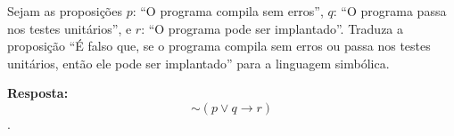 \documentclass{ufcdocument}
\begin{document}
\def\course{Lógica para Ciência da Computação}
\def\prof{Esdras Lins Bispo Jr.}
\def\semester{2026.1}
\def\codeCourse{ICE0239}
\def\registration{}
\def\student{}
\def\graduate{Bacharelado em Ciência da Computação}
\def\theme{Avaliação da Competência LCC C1.2:\\ \texttt{Conversão da linguagem natural para simbólica.}\\
23 de abril de 2026
}
    \makeheader
    
    \vspace{0.5cm}
    
     \begin{question}
        \item Sejam as proposições $p$: ``O programa compila sem erros'', $q$: ``O programa passa nos testes unitários'', e $r$: ``O programa pode ser implantado''. Traduza a proposição ``É falso que, se o programa compila sem erros ou passa nos testes unitários, então ele pode ser implantado'' para a linguagem simbólica.
    \end{question}

    \vspace{0.3cm}
        
    {\color{blue} {\bf Resposta:} 
        $$\sim (p \lor q \to r)$$
    .}
 
    \vfill
\end{document}
